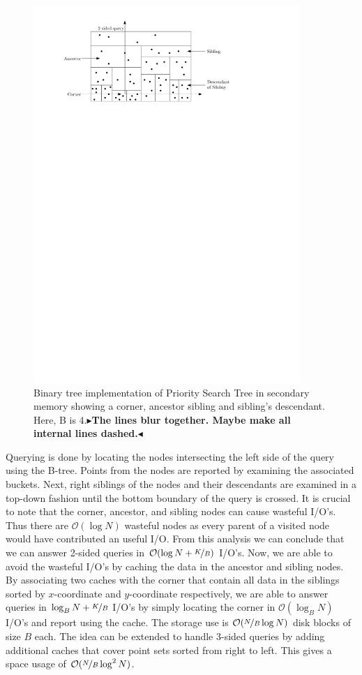 \documentclass[twoside,11pt,openright]{report}
\newcommand{\todo}[1]{{\color[rgb]{.5,0,0}\textbf{$\blacktriangleright$#1$\blacktriangleleft$}}}
\begin{document}
\begin{figure}[h]
	\centering
		\includegraphics[width=0.9\textwidth]{../figures/ramaswamy_query}
	\caption{Binary tree implementation of Priority Search Tree in secondary memory showing a corner, ancestor sibling and sibling's descendant. Here, B is 4.\todo{The lines blur together. Maybe make all internal lines dashed.}}
	\label{fig:ramaswamy_query}
\end{figure}

Querying is done by locating the nodes intersecting the left side of the query using the B-tree. Points from the nodes are reported by examining the associated buckets. Next, right siblings of the nodes and their descendants are examined in a top-down fashion until the bottom boundary of the query is crossed. It is crucial to note that the corner, ancestor, and sibling nodes can cause wasteful I/O's. Thus there are $\mathcal{O}(\log N)$ wasteful nodes as every parent of a visited node would have contributed an useful I/O. From this analysis we can conclude that we can answer 2-sided queries in $\mathcal{O}(\log N + \nicefrac{K}{B})$ I/O's. Now, we are able to avoid the wasteful I/O's by caching the data in the ancestor and sibling nodes. By associating two caches with the corner that contain all data in the siblings sorted by $x$-coordinate and $y$-coordinate respectively, we are able to answer queries in $\log_B N + \nicefrac{K}{B}$ I/O's by simply locating the corner in $\mathcal{O}(\log_B N)$ I/O's and report using the cache. The storage use is $\mathcal{O}(\nicefrac{N}{B} \log N)$ disk blocks of size $B$ each. The idea can be extended to handle 3-sided queries by adding additional caches that cover point sets sorted from right to left. This gives a space usage of $\mathcal{O}(\nicefrac{N}{B} \log^2 N)$. 
\end{document}
